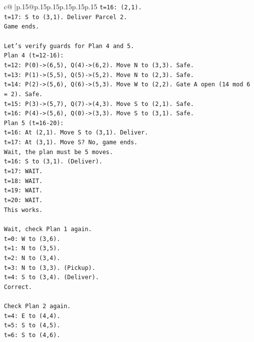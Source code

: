 \documentclass{article}
\begin{document}
{\begin{supertabular}{c@{$\;$}|p{.15\linewidth}@{}p{.15\linewidth}p{.15\linewidth}p{.15\linewidth}p{.15\linewidth}p{.15\linewidth}}
{{{\texttt{t=16: (2,1).} \\
\texttt{t=17: S to (3,1). Deliver Parcel 2.} \\
\texttt{Game ends.} \\
\\ 
\texttt{Let's verify guards for Plan 4 and 5.} \\
\texttt{Plan 4 (t=12{-}16):} \\
\texttt{t=12: P(0){-}>(6,5), Q(4){-}>(6,2). Move N to (3,3). Safe.} \\
\texttt{t=13: P(1){-}>(5,5), Q(5){-}>(5,2). Move N to (2,3). Safe.} \\
\texttt{t=14: P(2){-}>(5,6), Q(6){-}>(5,3). Move W to (2,2). Gate A open (14 mod 6 = 2). Safe.} \\
\texttt{t=15: P(3){-}>(5,7), Q(7){-}>(4,3). Move S to (2,1). Safe.} \\
\texttt{t=16: P(4){-}>(5,6), Q(0){-}>(3,3). Move S to (3,1). Safe.} \\
\texttt{Plan 5 (t=16{-}20):} \\
\texttt{t=16: At (2,1). Move S to (3,1). Deliver.} \\
\texttt{t=17: At (3,1). Move S? No, game ends.} \\
\texttt{Wait, the plan must be 5 moves.} \\
\texttt{t=16: S to (3,1). (Deliver).} \\
\texttt{t=17: WAIT.} \\
\texttt{t=18: WAIT.} \\
\texttt{t=19: WAIT.} \\
\texttt{t=20: WAIT.} \\
\texttt{This works.} \\
\\ 
\texttt{Wait, check Plan 1 again.} \\
\texttt{t=0: W to (3,6).} \\
\texttt{t=1: N to (3,5).} \\
\texttt{t=2: N to (3,4).} \\
\texttt{t=3: N to (3,3). (Pickup).} \\
\texttt{t=4: S to (3,4). (Deliver).} \\
\texttt{Correct.} \\
\\ 
\texttt{Check Plan 2 again.} \\
\texttt{t=4: E to (4,4).} \\
\texttt{t=5: S to (4,5).} \\
\texttt{t=6: S to (4,6).} \\
}}}
\end{supertabular}}
\end{document}
